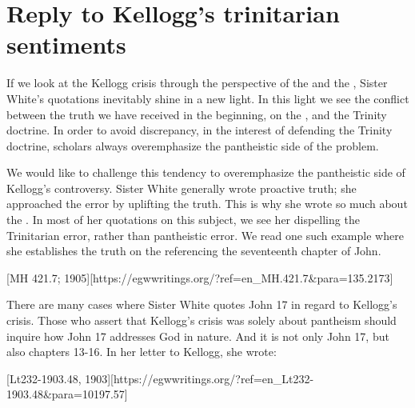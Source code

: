 \chapter{Reply to Kellogg’s trinitarian sentiments}

If we look at the Kellogg crisis through the perspective of the  and the , Sister White’s quotations inevitably shine in a new light. In this light we see the conflict between the truth we have received in the beginning, on the , and the Trinity doctrine. In order to avoid discrepancy, in the interest of defending the Trinity doctrine, scholars always overemphasize the pantheistic side of the problem.

We would like to challenge this tendency to overemphasize the pantheistic side of Kellogg’s controversy. Sister White generally wrote proactive truth; she approached the error by uplifting the truth. This is why she wrote so much about the . In most of her quotations on this subject, we see her dispelling the Trinitarian error, rather than pantheistic error. We read one such example where she establishes the truth on the  referencing the seventeenth chapter of John.

[MH 421.7; 1905][https://egwwritings.org/?ref=en\_MH.421.7&para=135.2173]

There are many cases where Sister White quotes John 17 in regard to Kellogg’s crisis. Those who assert that Kellogg’s crisis was solely about pantheism should inquire how John 17 addresses God in nature. And it is not only John 17, but also chapters 13-16. In her letter to Kellogg, she wrote:

[Lt232-1903.48, 1903][https://egwwritings.org/?ref=en\_Lt232-1903.48&para=10197.57]

